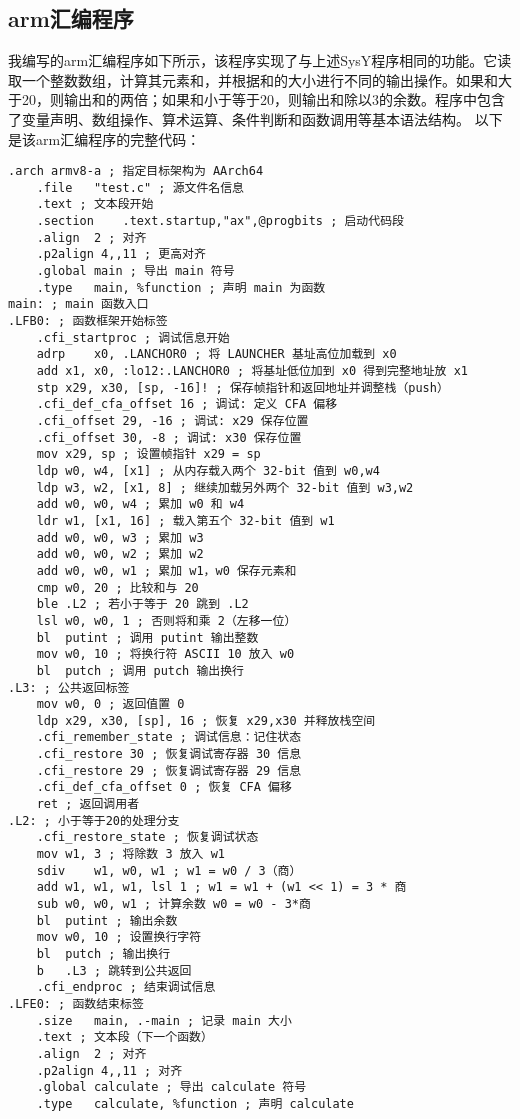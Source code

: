 \documentclass[a4paper]{article}
\begin{document}
\subsection{arm汇编程序}
我编写的arm汇编程序如下所示，该程序实现了与上述SysY程序相同的功能。它读取一个整数数组，计算其元素和，并根据和的大小进行不同的输出操作。如果和大于20，则输出和的两倍；如果和小于等于20，则输出和除以3的余数。程序中包含了变量声明、数组操作、算术运算、条件判断和函数调用等基本语法结构。
以下是该arm汇编程序的完整代码：
\begin{lstlisting}[title=逐列访问平凡算法,frame=trbl]
	.arch armv8-a ; 指定目标架构为 AArch64
	.file	"test.c" ; 源文件名信息
	.text ; 文本段开始
	.section	.text.startup,"ax",@progbits ; 启动代码段
	.align	2 ; 对齐
	.p2align 4,,11 ; 更高对齐
	.global	main ; 导出 main 符号
	.type	main, %function ; 声明 main 为函数
main: ; main 函数入口
.LFB0: ; 函数框架开始标签
	.cfi_startproc ; 调试信息开始
	adrp	x0, .LANCHOR0 ; 将 LAUNCHER 基址高位加载到 x0
	add	x1, x0, :lo12:.LANCHOR0 ; 将基址低位加到 x0 得到完整地址放 x1
	stp	x29, x30, [sp, -16]! ; 保存帧指针和返回地址并调整栈（push）
	.cfi_def_cfa_offset 16 ; 调试: 定义 CFA 偏移
	.cfi_offset 29, -16 ; 调试: x29 保存位置
	.cfi_offset 30, -8 ; 调试: x30 保存位置
	mov	x29, sp ; 设置帧指针 x29 = sp
	ldp	w0, w4, [x1] ; 从内存载入两个 32-bit 值到 w0,w4
	ldp	w3, w2, [x1, 8] ; 继续加载另外两个 32-bit 值到 w3,w2
	add	w0, w0, w4 ; 累加 w0 和 w4
	ldr	w1, [x1, 16] ; 载入第五个 32-bit 值到 w1
	add	w0, w0, w3 ; 累加 w3
	add	w0, w0, w2 ; 累加 w2
	add	w0, w0, w1 ; 累加 w1，w0 保存元素和
	cmp	w0, 20 ; 比较和与 20
	ble	.L2 ; 若小于等于 20 跳到 .L2
	lsl	w0, w0, 1 ; 否则将和乘 2（左移一位）
	bl	putint ; 调用 putint 输出整数
	mov	w0, 10 ; 将换行符 ASCII 10 放入 w0
	bl	putch ; 调用 putch 输出换行
.L3: ; 公共返回标签
	mov	w0, 0 ; 返回值置 0
	ldp	x29, x30, [sp], 16 ; 恢复 x29,x30 并释放栈空间
	.cfi_remember_state ; 调试信息：记住状态
	.cfi_restore 30 ; 恢复调试寄存器 30 信息
	.cfi_restore 29 ; 恢复调试寄存器 29 信息
	.cfi_def_cfa_offset 0 ; 恢复 CFA 偏移
	ret ; 返回调用者
.L2: ; 小于等于20的处理分支
	.cfi_restore_state ; 恢复调试状态
	mov	w1, 3 ; 将除数 3 放入 w1
	sdiv	w1, w0, w1 ; w1 = w0 / 3（商）
	add	w1, w1, w1, lsl 1 ; w1 = w1 + (w1 << 1) = 3 * 商
	sub	w0, w0, w1 ; 计算余数 w0 = w0 - 3*商
	bl	putint ; 输出余数
	mov	w0, 10 ; 设置换行字符
	bl	putch ; 输出换行
	b	.L3 ; 跳转到公共返回
	.cfi_endproc ; 结束调试信息
.LFE0: ; 函数结束标签
	.size	main, .-main ; 记录 main 大小
	.text ; 文本段（下一个函数）
	.align	2 ; 对齐
	.p2align 4,,11 ; 对齐
	.global	calculate ; 导出 calculate 符号
	.type	calculate, %function ; 声明 calculate

\end{lstlisting}
\end{document}
